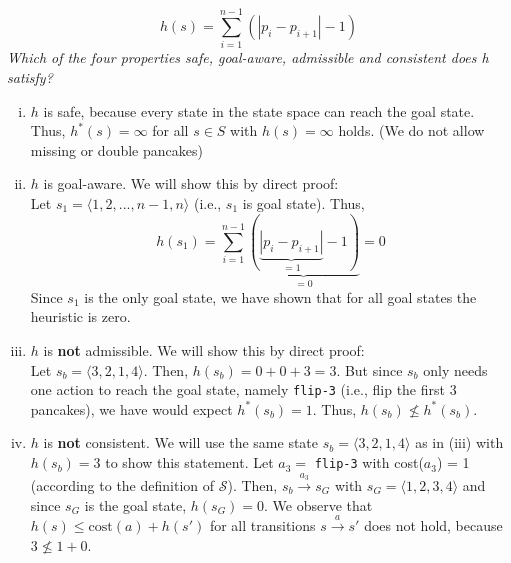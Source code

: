\documentclass{article} %
\begin{document}
\section{}
\begin{equation*}
    h(s) = \sum_{i=1}^{n-1} (|p_i - p_{i+1}| - 1)
\end{equation*}
\textit{Which of the four properties safe, goal-aware, admissible
and consistent does h satisfy?}
\begin{enumerate}[(i)]
    \item $h$ is safe, because every state in the state space can
    reach the goal state. Thus, $h^*(s) = \infty$ for all $s \in S$ with
    $h(s) = \infty$ holds. (We do not allow missing or double pancakes)

    \item $h$ is goal-aware. We will show this by direct proof:\\[0.5em]
    Let $s_1 = \langle 1, 2, ..., n-1, n \rangle$
    (i.e., $s_1$ is goal state). Thus,
    \begin{equation*}
        h(s_1) = \sum_{i=1}^{n-1} \underbrace{(\underbrace{|p_i - p_{i+1}|}_{= 1} - 1)}_{= 0}
        = 0
    \end{equation*}
    Since $s_1$ is the only goal state, we have shown that for all
    goal states the heuristic is zero.

    \item $h$ is \textbf{not} admissible. We will show this by direct proof: \\[0.5em]
    Let $s_b = \langle 3, 2, 1, 4 \rangle$. Then, $h(s_b) = 0 + 0 + 3 = 3 $.
    But since $s_b$ only needs one action to reach the goal state, namely
    \texttt{flip-3} (i.e., flip the first 3 pancakes), we have would expect
    $h^*(s_b) = 1$. Thus, $h(s_b) \not\le h^*(s_b) $.

    \item $h$ is \textbf{not} consistent. We will use the same state $s_b = \langle 3, 2, 1, 4 \rangle$
    as in (iii) with $h(s_b) = 3$ to show this statement. Let $a_3 = $ \texttt{flip-3} with
    cost($a_3$) = 1 (according to the definition of $\mathcal{S}$). Then, $s_b \xrightarrow{a_3} s_G$
    with $s_G = \langle 1, 2, 3, 4 \rangle$ and since $s_G$ is the goal state, $h(s_G) = 0$.
    We observe that $h(s) \le \text{cost}(a) + h(s')$ for all transitions $s \xrightarrow{a} s'$
    does not hold, because $3 \not\le 1 + 0$.

\end{enumerate}
\end{document}
